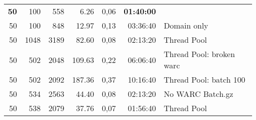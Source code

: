 \begin{table}[!ht]
\begin{tabular}{rrrrrrl}
    \textbf{50}  & 100          & 558          & 6.26         & 0,06         & \textbf{01:40:00} &                          \\
    50           & 100          & 848          & 12.97        & 0,13         & 03:36:40          & Domain only              \\
    50           & 1048         & 3189         & 82.60        & 0,08         & 02:13:20          & Thread Pool              \\
    50           & 502          & 2048         & 109.63       & 0,22         & 06:06:40          & Thread Pool: broken warc \\
    50           & 502          & 2092         & 187.36       & 0,37         & 10:16:40          & Thread Pool: batch 100   \\
    50           & 534          & 2563         & 44.40        & 0,08         & 02:13:20          & No WARC Batch.gz         \\
    50           & 538          & 2079         & 37.76        & 0,07         & 01:56:40          & Thread Pool              \\

\end{tabular}
\end{table}
